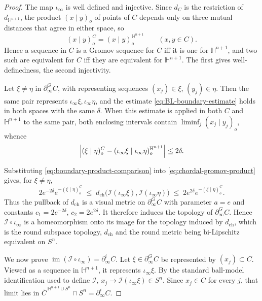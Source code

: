 \documentclass[12pt,oneside,a4paper]{article}
\theoremstyle{mytheorem}
\theoremstyle{remark}
\theoremstyle{definition}
\begin{document}
\begin{proof}
The map \(\iota_\infty\) is well defined and injective.
Since \(d_C\) is the restriction of \(d_{\mathbb H^{n+1}}\), the product
\((x\mid y)_o\) of points of \(C\) depends only on three mutual
distances that agree in either space, so
\begin{equation}\label{eq:products-agree}
 (x\mid y)^C_o=(x\mid y)^{\mathbb H^{n+1}}_o
 \qquad(x,y\in C).
\end{equation}
Hence a sequence in \(C\) is a Gromov sequence for \(C\) iff it is one
for \(\mathbb H^{n+1}\), and two such are equivalent for \(C\) iff they
are equivalent for \(\mathbb H^{n+1}\).  The first gives
well-definedness, the second injectivity.

Let \(\xi\neq\eta\) in \(\partial_\infty^{G}C\), with representing
sequences \((x_j)\in\xi\), \((y_j)\in\eta\). Then the same pair
represents \(\iota_\infty\xi,\iota_\infty\eta\), and the
estimate \eqref{eq:BL-boundary-estimate} holds in both spaces with the
same \(\delta\).  When this estimate is applied in both \(C\) and \(\mathbb H^{n+1}\) to the
same pair, both enclosing intervals contain
\(\liminf_j(x_j\mid y_j)_o\), whence
\begin{equation}\label{eq:boundary-product-comparison}
 \Bigl|
 (\xi\mid\eta)^C_o
 -(\iota_\infty\xi\mid\iota_\infty\eta)^{\mathbb H^{n+1}}_o
 \Bigr|\leq2\delta .
\end{equation}

Substituting \eqref{eq:boundary-product-comparison} into
\eqref{eq:chordal-gromov-product} gives, for \(\xi\neq\eta\),
\begin{equation}\label{eq:chordal-is-visual}
 2e^{-2\delta}e^{-(\xi\mid\eta)^C_o}
 \;\leq\;
 d_{\mathrm{ch}}\bigl(
 \mathcal I(\iota_\infty\xi),\mathcal I(\iota_\infty\eta)\bigr)
 \;\leq\;
 2e^{2\delta}e^{-(\xi\mid\eta)^C_o} .
\end{equation}
Thus the pullback of \(d_{\mathrm{ch}}\) is a visual metric on
\(\partial_\infty^{G}C\) with parameter \(a=e\) and constants
\(c_1=2e^{-2\delta}\), \(c_2=2e^{2\delta}\). It therefore induces
the topology of \(\partial_\infty^{G}C\).  Hence
\(\mathcal I\circ\iota_\infty\) is a homeomorphism onto its image for
the topology induced by \(d_{\mathrm{ch}}\), which is the round subspace
topology, \(d_{\mathrm{ch}}\) and the round metric being bi-Lipschitz
equivalent on \(S^n\).

We now prove \(\operatorname{im}(\mathcal I\circ\iota_\infty)
=\partial_\infty^{i}C\).  Let \(\xi\in\partial_\infty^{G}C\) be represented by
\((x_j)\subset C\). Viewed as a sequence in \(\mathbb H^{n+1}\), it
represents \(\iota_\infty\xi\). By the standard ball-model identification
used to define \(\mathcal I\),
\(x_j\to \mathcal I(\iota_\infty\xi)\in S^n\).
Since \(x_j\in C\) for every
\(j\), that limit lies in
\(\overline C^{\,\mathbb H^{n+1}\cup S^n}\cap S^n=\partial_\infty^{i}C\).


\end{proof}
\end{document}
